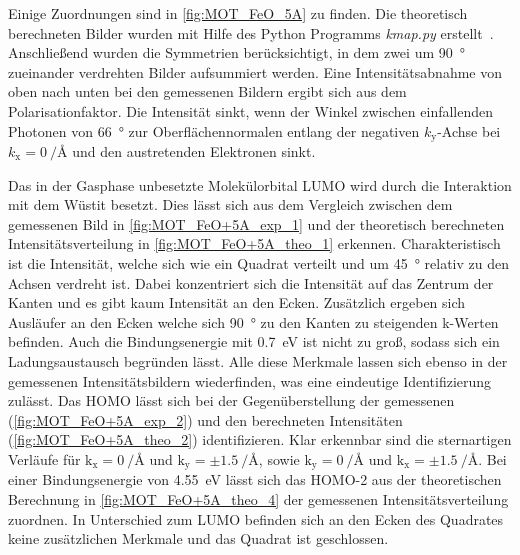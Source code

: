         Einige Zuordnungen sind in \autoref{fig:MOT_FeO_5A} zu finden.
        Die theoretisch berechneten Bilder wurden mit Hilfe des Python Programms \textit{kmap.py} erstellt~\cite{brandstetter_kmappy_2021}.
        Anschließend wurden die Symmetrien berücksichtigt, in dem zwei um \SI{90}{\degree} zueinander verdrehten Bilder aufsummiert werden.
        Eine Intensitätsabnahme von oben nach unten bei den gemessenen Bildern ergibt sich aus dem Polarisationfaktor.
        Die Intensität sinkt, wenn der Winkel zwischen einfallenden Photonen von \SI{66}{\degree} zur Oberflächennormalen entlang der negativen $k_\text{y}$-Achse bei $k_\text{x} = \SI[per-mode=reciprocal]{0}{\per\angstrom}$ und den austretenden Elektronen sinkt.

        Das in der Gasphase unbesetzte Molekülorbital LUMO wird durch die Interaktion mit dem Wüstit besetzt.
        Dies lässt sich aus dem Vergleich zwischen dem gemessenen Bild in \autoref{fig:MOT_FeO+5A_exp_1} und der theoretisch berechneten Intensitätsverteilung in \autoref{fig:MOT_FeO+5A_theo_1} erkennen.
        Charakteristisch ist die Intensität, welche sich wie ein Quadrat verteilt und um \SI{45}{\degree} relativ zu den Achsen verdreht ist.
        Dabei konzentriert sich die Intensität auf das Zentrum der Kanten und es gibt kaum Intensität an den Ecken.
        Zusätzlich ergeben sich Ausläufer an den Ecken welche sich \SI{90}{\degree} zu den Kanten zu steigenden k-Werten befinden.
        Auch die Bindungsenergie mit \SI{0.7}{\electronvolt} ist nicht zu groß, sodass sich ein Ladungsaustausch begründen lässt.
        Alle diese Merkmale lassen sich ebenso in der gemessenen Intensitätsbildern wiederfinden, was eine eindeutige Identifizierung zulässt.
        Das HOMO lässt sich bei der Gegenüberstellung der gemessenen (\autoref{fig:MOT_FeO+5A_exp_2}) und den berechneten Intensitäten (\autoref{fig:MOT_FeO+5A_theo_2}) identifizieren.
        Klar erkennbar sind die sternartigen Verläufe für $\text{k}_\text{x} = \SI[per-mode=reciprocal]{0}{\per\angstrom}$ und $\text{k}_\text{y} = \pm\SI[per-mode=reciprocal]{1.5}{\per\angstrom}$, sowie $\text{k}_\text{y} = \SI[per-mode=reciprocal]{0}{\per\angstrom}$ und $\text{k}_\text{x} = \pm\SI[per-mode=reciprocal]{1.5}{\per\angstrom}$.
        Bei einer Bindungsenergie von \SI{4.55}{\electronvolt} lässt sich das HOMO-2 aus der theoretischen Berechnung in \autoref{fig:MOT_FeO+5A_theo_4} der gemessenen Intensitätsverteilung zuordnen.
        In Unterschied zum LUMO befinden sich an den Ecken des Quadrates keine zusätzlichen Merkmale und das Quadrat ist geschlossen.
